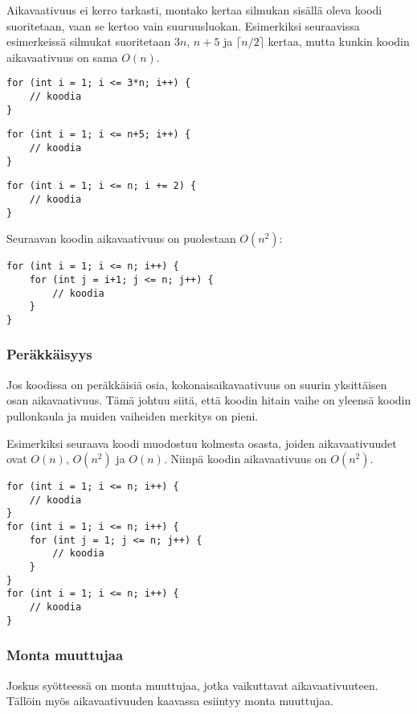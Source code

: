 Aikavaativuus ei kerro tarkasti,
montako kertaa silmukan sisällä oleva koodi suoritetaan,
vaan se kertoo vain suuruusluokan.
Esimerkiksi seuraavissa esimerkeissä silmukat
suoritetaan $3n$, $n+5$ ja $\lceil n/2 \rceil$ kertaa,
mutta kunkin koodin aikavaativuus on sama $O(n)$.

\begin{lstlisting}
for (int i = 1; i <= 3*n; i++) {
    // koodia
}
\end{lstlisting}

\begin{lstlisting}
for (int i = 1; i <= n+5; i++) {
    // koodia
}
\end{lstlisting}

\begin{lstlisting}
for (int i = 1; i <= n; i += 2) {
    // koodia
}
\end{lstlisting}

Seuraavan koodin aikavaativuus on puolestaan $O(n^2)$:

\begin{lstlisting}
for (int i = 1; i <= n; i++) {
    for (int j = i+1; j <= n; j++) {
        // koodia
    }
}
\end{lstlisting}

\subsubsection*{Peräkkäisyys}

Jos koodissa on peräkkäisiä osia,
kokonaisaikavaativuus on suurin yksittäisen
osan aikavaativuus.
Tämä johtuu siitä, että koodin hitain
vaihe on yleensä koodin pullonkaula
ja muiden vaiheiden merkitys on pieni.

Esimerkiksi seuraava koodi muodostuu
kolmesta osasta,
joiden aikavaativuudet ovat $O(n)$, $O(n^2)$ ja $O(n)$.
Niinpä koodin aikavaativuus on $O(n^2)$.

\begin{lstlisting}
for (int i = 1; i <= n; i++) {
    // koodia
}
for (int i = 1; i <= n; i++) {
    for (int j = 1; j <= n; j++) {
        // koodia
    }
}
for (int i = 1; i <= n; i++) {
    // koodia
}
\end{lstlisting}

\subsubsection*{Monta muuttujaa}

Joskus syötteessä on monta muuttujaa,
jotka vaikuttavat aikavaativuuteen.
Tällöin myös aikavaativuuden kaavassa esiintyy
monta muuttujaa.

